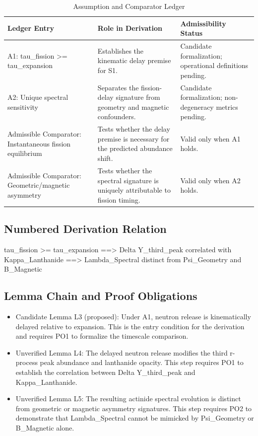 \documentclass[conference]{IEEEtran}
\begin{document}
\begin{table}[htbp]
\centering
\footnotesize
\setlength{\tabcolsep}{3pt}
\renewcommand{\arraystretch}{1.12}
\caption{Assumption and Comparator Ledger}
\label{tab:forward-derivation-and-counterexamples-fd-sec-02}
\begin{tabular}{|p{}|p{}|p{}|}
\hline
Ledger Entry & Role in Derivation & Admissibility Status \\\hline
A1: tau\_fission >= tau\_expansion & Establishes the kinematic delay premise for S1. & Candidate formalization; operational definitions pending. \\\hline
A2: Unique spectral sensitivity & Separates the fission-delay signature from geometry and magnetic confounders. & Candidate formalization; non-degeneracy metrics pending. \\\hline
Admissible Comparator: Instantaneous fission equilibrium & Tests whether the delay premise is necessary for the predicted abundance shift. & Valid only when A1 holds. \\\hline
Admissible Comparator: Geometric/magnetic asymmetry & Tests whether the spectral signature is uniquely attributable to fission timing. & Valid only when A2 holds. \\\hline
\end{tabular}
\end{table}

\subsection{Numbered Derivation Relation}
tau\_fission >= tau\_expansion ==> Delta Y\_third\_peak correlated with Kappa\_Lanthanide ==> Lambda\_Spectral distinct from Psi\_Geometry and B\_Magnetic

\subsection{Lemma Chain and Proof Obligations}
\begin{itemize}
\item Candidate Lemma L3 (proposed): Under A1, neutron release is kinematically delayed relative to expansion. This is the entry condition for the derivation and requires PO1 to formalize the timescale comparison.
\item Unverified Lemma L4: The delayed neutron release modifies the third r-process peak abundance and lanthanide opacity. This step requires PO1 to establish the correlation between Delta Y\_third\_peak and Kappa\_Lanthanide.
\item Unverified Lemma L5: The resulting actinide spectral evolution is distinct from geometric or magnetic asymmetry signatures. This step requires PO2 to demonstrate that Lambda\_Spectral cannot be mimicked by Psi\_Geometry or B\_Magnetic alone.
\end{itemize}~\cite{cite_2bf3a687e25803e4,cite_b89745a07eed477d}
\end{document}
